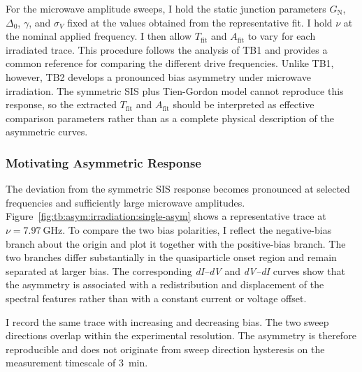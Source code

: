         For the microwave amplitude sweeps, I hold the static junction parameters $G_\mathrm{N}$, $\Delta_0$, $\gamma$, and $\sigma_V$ fixed at the values obtained from the representative fit. I hold $\nu$ at the nominal applied frequency. I then allow $T_\mathrm{fit}$ and $A_\mathrm{fit}$ to vary for each irradiated trace. This procedure follows the analysis of TB1 and provides a common reference for comparing the different drive frequencies. Unlike TB1, however, TB2 develops a pronounced bias asymmetry under microwave irradiation. The symmetric SIS plus Tien-Gordon model cannot reproduce this response, so the extracted $T_\mathrm{fit}$ and $A_\mathrm{fit}$ should be interpreted as effective comparison parameters rather than as a complete physical description of the asymmetric curves.

    \subsubsection*{Motivating Asymmetric Response}
    \label{subsec:tb:asym:representative}

        The deviation from the symmetric SIS response becomes pronounced at selected frequencies and sufficiently large microwave amplitudes. Figure~\ref{fig:tb:asym:irradiation:single-asym} shows a representative trace at $\nu=\qty{7.97}{\giga\hertz}$. To compare the two bias polarities, I reflect the negative-bias branch about the origin and plot it together with the positive-bias branch. The two branches differ substantially in the quasiparticle onset region and remain separated at larger bias. The corresponding \textit{dI--dV} and \textit{dV--dI} curves show that the asymmetry is associated with a redistribution and displacement of the spectral features rather than with a constant current or voltage offset.

        I record the same trace with increasing and decreasing bias. The two sweep directions overlap within the experimental resolution. The asymmetry is therefore reproducible and does not originate from sweep direction hysteresis on the measurement timescale of \qty{3}{\minute}.


